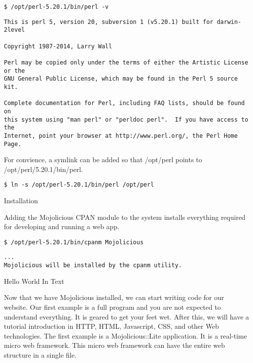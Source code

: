 \documentclass[14pt]{extreport}
\begin{document}
\begin{lstlisting}[style=BashInputStyle]
$ /opt/perl-5.20.1/bin/perl -v
\end{lstlisting}

\begin{lstlisting}[style=BashOutputStyle]
This is perl 5, version 20, subversion 1 (v5.20.1) built for darwin-2level

Copyright 1987-2014, Larry Wall

Perl may be copied only under the terms of either the Artistic License or the
GNU General Public License, which may be found in the Perl 5 source kit.

Complete documentation for Perl, including FAQ lists, should be found on
this system using "man perl" or "perldoc perl".  If you have access to the
Internet, point your browser at http://www.perl.org/, the Perl Home Page.
\end{lstlisting}

For convience, a symlink can be added so that /opt/perl points to
/opt/perl/5.20.1/bin/perl.

\begin{lstlisting}[style=BashInputStyle]
$ ln -s /opt/perl-5.20.1/bin/perl /opt/perl
\end{lstlisting}

{\Large Installation}

Adding the Mojolicious CPAN module to the system installs everything required
for developing and running a web app.

\begin{lstlisting}[style=BashInputStyle]
$ /opt/perl-5.20.1/bin/cpanm Mojolicious
\end{lstlisting}

\begin{lstlisting}[style=BashOutputStyle]
...
Mojolicious will be installed by the cpanm utility.
\end{lstlisting}

{\Large Hello World In Text}

Now that we have Mojolicious installed, we can start writing code for our
website. Our first example is a full program and you are not expected to
understand everything. It is geared to get your feet wet. After this, we will
have a tutorial introduction in HTTP, HTML, Javascript, CSS, and other Web
technologies.  The first example is a Mojolicious::Lite application. It is a
real-time micro web framework. This micro web framework can have the entire web
structure in a single file.
\end{document}
